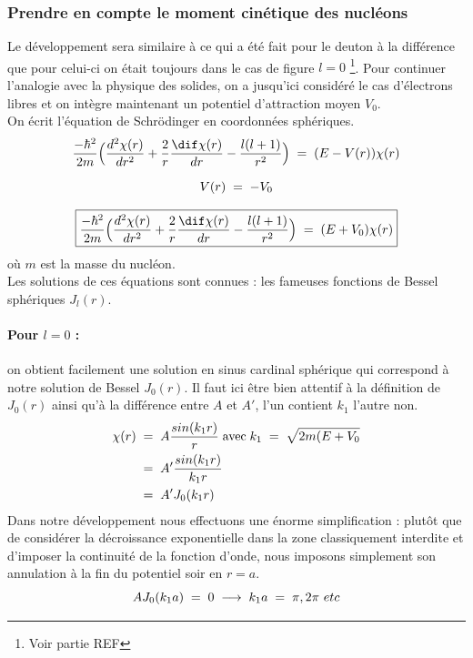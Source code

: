 \subsubsection{Prendre en compte le moment cinétique des nucléons}
Le développement sera similaire à ce qui a été fait pour le deuton à la différence que pour celui-ci on était toujours dans le cas de figure $l=0$ \footnote{Voir partie REF}. Pour continuer l'analogie avec la physique des solides, on a jusqu'ici considéré le cas d'électrons libres et on intègre maintenant un potentiel d'attraction moyen $V_0$.\\
On écrit l'équation de Schrödinger en coordonnées sphériques.
\begin{equation*}
       \dfrac{-\hbar^2}{2m} \Big(\dfrac{d^2\chi(r)}{dr^2} + \dfrac{2}{r}\dfrac{\dif\chi(r)}{dr} - \dfrac{l(l+1)}{r^2}\Big)\eq (E-V(r))\chi(r)
\end{equation*}

\begin{equation*}
    V(r) \; = \; -V_0
\end{equation*}

\begin{equation*}
    \boxed{
       \dfrac{-\hbar^2}{2m} \Big(\dfrac{d^2\chi(r)}{dr^2} + \dfrac{2}{r}\dfrac{\dif\chi(r)}{dr} - \dfrac{l(l+1)}{r^2}\Big)\eq (E+V_0)\chi(r)
    }
\end{equation*}
où $m$ est la masse du nucléon.\\
Les solutions de ces équations sont connues : les fameuses fonctions de Bessel sphériques $J_l(r)$.
\paragraph{Pour $l=0$ :} on obtient facilement une solution en sinus cardinal sphérique qui correspond à notre solution de Bessel $J_0(r)$. Il faut ici être bien attentif à la définition de $J_0(r)$ ainsi qu'à la différence entre $A$ et $A'$, l'un contient $k_1$ l'autre non.
\begin{align*}
    \chi(r) &\; = \; A\dfrac{sin(k_1r)}{r}\; \text{avec}\; k_1 \; = \; \sqrt{2m(E+V_0}\\
    &\; = \; A' \dfrac{sin(k_1r)}{k_1 r}\\
    &\; = \; A'J_0(k_1 r)
\end{align*}
Dans notre développement nous effectuons une énorme simplification : plutôt que de considérer la décroissance exponentielle dans la zone classiquement interdite et d'imposer la continuité de la fonction d'onde, nous imposons simplement son annulation à la fin du potentiel soir en $r = a$.
\begin{equation*}
    AJ_0(k_1a) \; = \; 0 \; \longrightarrow \; k_1 a \; = \; \pi,2\pi \ etc
\end{equation*}
